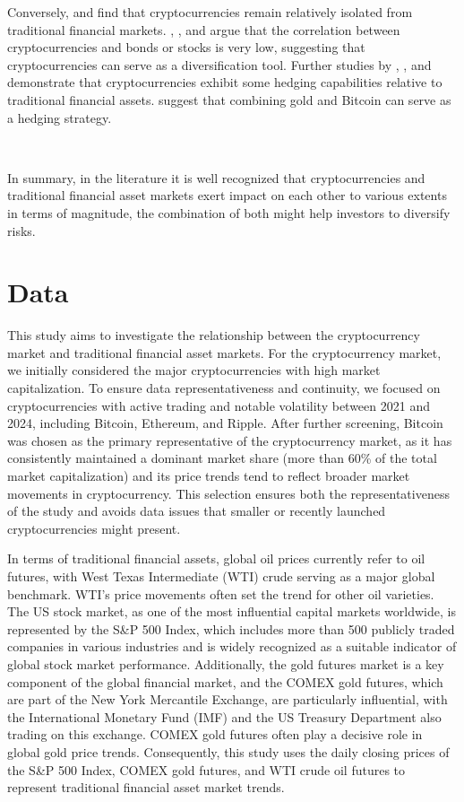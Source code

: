 \documentclass{article}
\begin{document}
Conversely, \cite{corbet2019cryptocurrencies} and \cite{baur2018b} find that cryptocurrencies remain relatively isolated from traditional financial markets. \cite{baur2018b}, \cite{briere2015virtual}, and \cite{bouri2018bitcoin} argue that the correlation between cryptocurrencies and bonds or stocks is very low, suggesting that cryptocurrencies can serve as a diversification tool. Further studies by \cite{dyhrberg2016b}, \cite{bouri2018bitcoin}, and \cite{bencheikh2020asymmetric} demonstrate that cryptocurrencies exhibit some hedging capabilities relative to traditional financial assets. \cite{yermack2015} suggest that combining gold and Bitcoin can serve as a hedging strategy.

\


In summary, in the literature it is well recognized that cryptocurrencies and traditional financial asset markets exert impact on each other to various extents in terms of magnitude, the combination of both might help investors to diversify risks. 



\section{Data}


This study aims to investigate the relationship between the cryptocurrency market and traditional financial asset markets. For the cryptocurrency market, we initially considered the major cryptocurrencies with high market capitalization. To ensure data representativeness and continuity, we focused on cryptocurrencies with active trading and notable volatility between 2021 and 2024, including Bitcoin, Ethereum, and Ripple. After further screening, Bitcoin was chosen as the primary representative of the cryptocurrency market, as it has consistently maintained a dominant market share (more than 60\% of the total market capitalization) and its price trends tend to reflect broader market movements in cryptocurrency. This selection ensures both the representativeness of the study and avoids data issues that smaller or recently launched cryptocurrencies might present.

In terms of traditional financial assets, global oil prices currently refer to oil futures, with West Texas Intermediate (WTI) crude serving as a major global benchmark. WTI’s price movements often set the trend for other oil varieties. The US stock market, as one of the most influential capital markets worldwide, is represented by the S\&P 500 Index, which includes more than 500 publicly traded companies in various industries and is widely recognized as a suitable indicator of global stock market performance. Additionally, the gold futures market is a key component of the global financial market, and the COMEX gold futures, which are part of the New York Mercantile Exchange, are particularly influential, with the International Monetary Fund (IMF) and the US Treasury Department also trading on this exchange. COMEX gold futures often play a decisive role in global gold price trends. Consequently, this study uses the daily closing prices of the S\&P 500 Index, COMEX gold futures, and WTI crude oil futures to represent traditional financial asset market trends.
 
\end{document}
